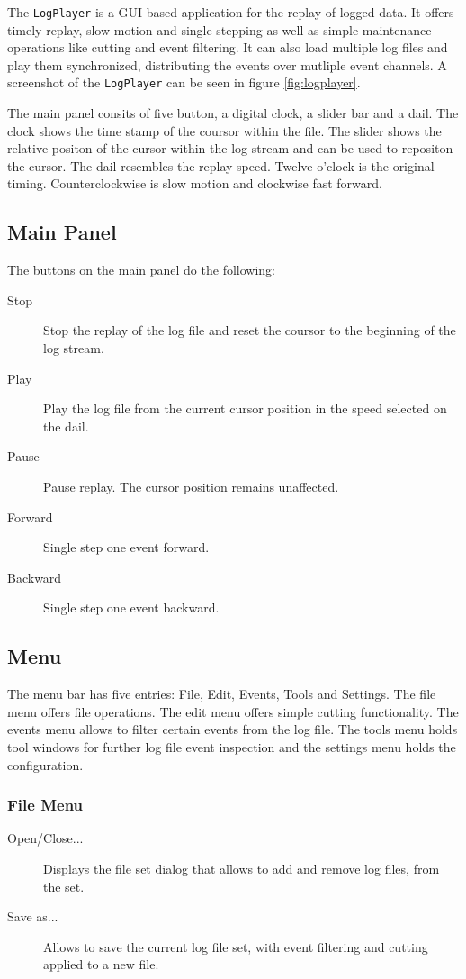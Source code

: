 The \texttt{LogPlayer} is a GUI-based application for the replay of
logged data. It offers timely replay, slow motion and single stepping
as well as simple maintenance operations like cutting and event
filtering. It can also load multiple log files and play them
synchronized, distributing the events over mutliple event channels. A
screenshot of the \texttt{LogPlayer} can be seen in figure
\ref{fig:logplayer}.

The main panel consits of five button, a digital clock, a slider bar
and a dail. The clock shows the time stamp of the coursor within the
file. The slider shows the relative positon of the cursor within the
log stream and can be used to repositon the cursor. The dail resembles
the replay speed. Twelve o'clock is the original timing.
Counterclockwise is slow motion and clockwise fast forward.

\subsection{Main Panel}

The buttons on the main panel do the following:
\begin{description}
\item[Stop] Stop the replay of the log file and reset the coursor to
  the beginning of the log stream.
\item[Play] Play the log file from the current cursor position in the
  speed selected on the dail.
\item[Pause] Pause replay. The cursor position remains unaffected.
\item[Forward] Single step one event forward.
\item[Backward] Single step one event backward.
\end{description}

\subsection{Menu}

The menu bar has five entries: File, Edit, Events, Tools and Settings.
The file menu offers file operations. The edit menu offers simple
cutting functionality. The events menu allows to filter certain events
from the log file. The tools menu holds tool windows for further log
file event inspection and the settings menu holds the configuration.

\subsubsection{File Menu}
\begin{description}
\item[Open/Close...] Displays the file set dialog that allows to add and
  remove log files, from the set.
\item[Save as...] Allows to save the current log file set, with event
  filtering and cutting applied to a new file.
\end{description}

